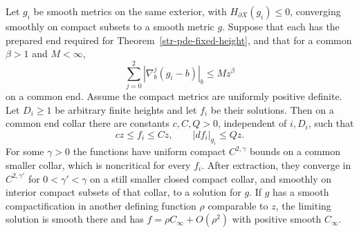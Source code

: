 \begin{lemma}
\label{lem:str-uniform-end}
\label{str-pde-growing-heights}
Let $g_i$ be smooth metrics on the same exterior, with
$H_{\partial X}(g_i)\leq0$, converging smoothly on compact
subsets to a smooth metric $g$. Suppose that each has the
prepared end required for Theorem~\ref{str-pde-fixed-height},
and that for a common $\beta>1$ and $M<\infty$,
\begin{equation}\label{str-pde-uniform-physical-metrics}
 \sum_{j=0}^2|\nabla_b^j(g_i-b)|_b\leq Mz^\beta
\end{equation}
on a common end. Assume the compact metrics are uniformly
positive definite. Let $D_i\geq1$ be arbitrary finite heights
and let $f_i$ be their solutions. Then on a common end collar
there are constants $c,C,Q>0$, independent of $i,D_i$, such that
\begin{equation}\label{str-pde-uniform-linear-bounds}
 cz\leq f_i\leq Cz,\qquad |df_i|_{g_i}\leq Qz.
\end{equation}
For some $\gamma>0$ the functions have uniform compact
$C^{2,\gamma}$ bounds on a common smaller collar, which is
noncritical for every $f_i$. After extraction, they converge
in $C^{2,\gamma'}$ for $0<\gamma'<\gamma$ on a still smaller
closed compact collar, and smoothly on interior compact subsets
of that collar, to a solution for $g$.
If $g$ has a smooth compactification in another defining
function $\rho$ comparable to $z$, the limiting solution is
smooth there and has $f=\rho C_\infty+O(\rho^2)$ with positive
smooth $C_\infty$.
\end{lemma}
